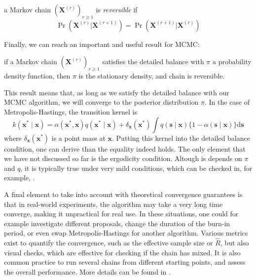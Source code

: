 \documentclass[12pt]{memoir}
\newcommand{\mb}{\mathbf}
\newcommand{\ti}{\textit}
\begin{document}
\begin{boxedthm}
    a Markov chain $(\mb X^{(r)})_{r\geq1}$ is \ti{reversible} if
\begin{equation}
    \Pr(\mb X^{(r)} | \mb X^{(r+1)}) = \Pr(\mb X^{(r+1)} | \mb X^{(r)})
\end{equation}
\end{boxedthm}
Finally, we can reach an important and useful result for MCMC:

\begin{boxedthm}
    if a Markov chain $(\mb X^{(r)})_{r\geq1}$ satisfies the detailed balance with $\pi$ a probability density function, then $\pi$ is the stationary density, and chain is reversible.
\end{boxedthm}

This result means that, as long as we satisfy the detailed balance with our MCMC algorithm, we will converge to the posterior distribution $\pi$. In the case of Metropolis-Hastings, the transition kernel is 
\begin{equation}
    k\left(\boldsymbol{x}^* \mid \boldsymbol{x}\right)=\alpha\left(\boldsymbol{x}^*, \boldsymbol{x}\right) q\left(\boldsymbol{x}^* \mid \boldsymbol{x}\right)+\delta_{\boldsymbol{x}}\left(\boldsymbol{x}^*\right) \int q(\boldsymbol{s} \mid \boldsymbol{x})\{1-\alpha(\boldsymbol{s} \mid \boldsymbol{x})\} \mathrm{d} \boldsymbol{s}
\end{equation}
where $\delta_{\mb x}(\mb x^*)$ is a point mass at $\mb x$. Putting this kernel into the detailed balance condition, one can derive than the equality indeed holds. The only element that we have not discussed so far is the ergodicity condition. Altough is depends on $\pi$ and $q$, it is typically true under very mild conditions, which can be checked in, for example, \cite{mcmc:RobertCasella2004}.\medbreak

A final element to take into account with theoretical convergence guarantees is that in real-world experiments, the algorithm may take a very long time converge, making it unpractical for real use. In these situations, one could for example investigate different proposals, change the duration of the burn-in period, or even swap Metropolis-Hastings for another algorithm. Various metrics exist to quantify the convergence, such as the effective sample size or $\hat R$, but also visual checks, which are effective for checking if the chain has mixed. It is also common practice to run several chains from different starting points, and assess the overall performance. More details can be found in \cite{mcmc:gelman2013bayesian}.
\end{document}
